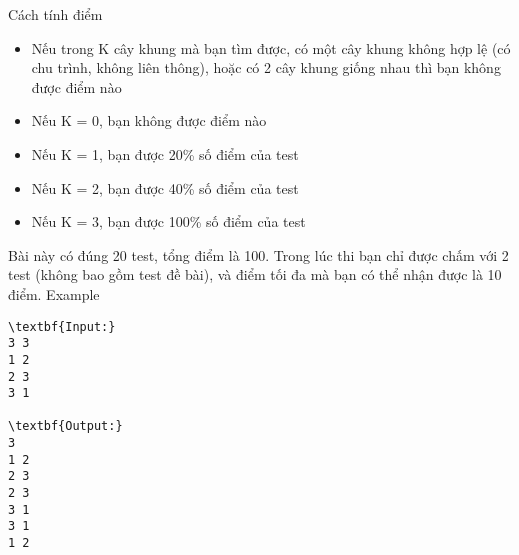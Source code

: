 Cách tính điểm
\begin{itemize}
	\item Nếu trong K cây khung mà bạn tìm được, có một cây khung không hợp lệ (có chu trình, không liên thông), hoặc có 2 cây khung giống nhau thì bạn không được điểm nào
	\item Nếu K = 0, bạn không được điểm nào
	\item Nếu K = 1, bạn được 20\% số điểm của test
	\item Nếu K = 2, bạn được 40\% số điểm của test
	\item Nếu K = 3, bạn được 100\% số điểm của test
\end{itemize}

Bài này có đúng 20 test, tổng điểm là 100. Trong lúc thi bạn chỉ được chấm với 2 test (không bao gồm test đề bài), và điểm tối đa mà bạn có thể nhận được là 10 điểm.
Example
\begin{verbatim}
\textbf{Input:}
3 3
1 2
2 3
3 1

\textbf{Output:}
3
1 2
2 3
2 3
3 1
3 1
1 2\end{verbatim}